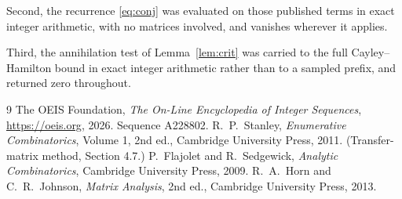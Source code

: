 \documentclass[11pt,a4paper]{article}
\theoremstyle{plain}
\theoremstyle{definition}
\begin{document}
Second, the recurrence \eqref{eq:conj} was evaluated on those published terms in exact
integer arithmetic, with no matrices involved, and vanishes wherever it applies.

Third, the annihilation test of Lemma~\ref{lem:crit} was carried to the full
Cayley--Hamilton bound in exact integer arithmetic rather than to a sampled prefix, and
returned zero throughout.

\begin{thebibliography}{9}
 The OEIS Foundation, \emph{The On-Line Encyclopedia of Integer
Sequences}, \url{https://oeis.org}, 2026. Sequence A228802.
 R.~P.~Stanley, \emph{Enumerative Combinatorics}, Volume 1, 2nd ed.,
Cambridge University Press, 2011. (Transfer-matrix method, Section 4.7.)
 P.~Flajolet and R.~Sedgewick, \emph{Analytic Combinatorics}, Cambridge
University Press, 2009.
 R.~A.~Horn and C.~R.~Johnson, \emph{Matrix Analysis}, 2nd ed., Cambridge
University Press, 2013.
\end{thebibliography}
\end{document}
